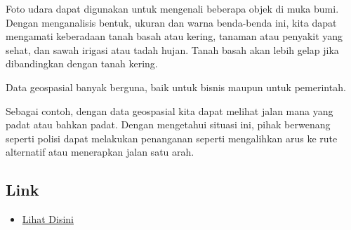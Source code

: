 Foto udara dapat digunakan untuk mengenali beberapa objek di muka bumi. Dengan menganalisis bentuk, ukuran dan warna benda-benda ini, kita dapat mengamati keberadaan tanah basah atau kering, tanaman atau penyakit yang sehat, dan sawah irigasi atau tadah hujan. Tanah basah akan lebih gelap jika dibandingkan dengan tanah kering.

Data geospasial banyak berguna, baik untuk bisnis maupun untuk pemerintah.\hfill\break

Sebagai contoh, dengan data geospasial kita dapat melihat jalan mana yang padat atau bahkan padat. Dengan mengetahui situasi ini, pihak berwenang seperti polisi dapat melakukan penanganan seperti mengalihkan arus ke rute alternatif atau menerapkan jalan satu arah.

\subsection{Link}
\begin{itemize}
	\item \href{https://youtu.be/GOjKvnfiYC8}{Lihat Disini}
\end{itemize}
